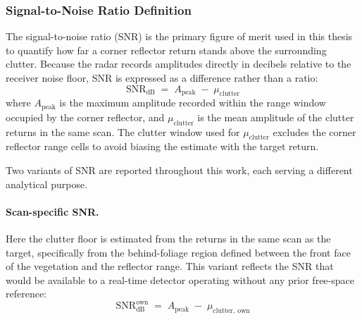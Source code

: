 %



\subsubsection*{Signal-to-Noise Ratio Definition}

The signal-to-noise ratio (SNR) is the primary figure of merit used in this
thesis to quantify how far a corner reflector return stands above the
surrounding clutter.
Because the radar records amplitudes directly in decibels relative to the
receiver noise floor, SNR is expressed as a difference rather than a ratio:
\begin{equation}
    \mathrm{SNR}_{\mathrm{dB}} \;=\; A_{\mathrm{peak}} \;-\; \mu_{\mathrm{clutter}}
    \label{eq:snr_definition}
\end{equation}
where $A_{\mathrm{peak}}$ is the maximum amplitude recorded within the range
window occupied by the corner reflector, and $\mu_{\mathrm{clutter}}$ is the
mean amplitude of the clutter returns in the same scan.
The clutter window used for $\mu_{\mathrm{clutter}}$ excludes the corner
reflector range cells to avoid biasing the estimate with the target return.

Two variants of SNR are reported throughout this work, each serving a
different analytical purpose.

\paragraph{Scan-specific SNR.}
Here the clutter floor is estimated from the returns in the same scan as the
target, specifically from the behind-foliage region defined between the front
face of the vegetation and the reflector range.
This variant reflects the SNR that would be available to a real-time detector
operating without any prior free-space reference:
\begin{equation}
    \mathrm{SNR}^{\mathrm{own}}_{\mathrm{dB}}
    \;=\; A_{\mathrm{peak}} \;-\; \mu_{\mathrm{clutter,\ own}}
    \label{eq:snr_own}
\end{equation}

